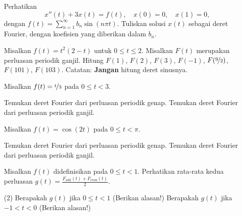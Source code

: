\begin{exercise}
Perhatikan
\begin{equation*}
x''(t) + 3 x(t) = f(t) , \quad x(0) = 0, \quad x(1) = 0,
\end{equation*}
dengan $f(t) = \sum_{n=1}^\infty b_n \sin (n \pi t)$.  Tuliskan solusi $x(t)$
sebagai deret Fourier, dengan koefisien yang diberikan dalam $b_n$.
\end{exercise}

\begin{exercise}
Misalkan $f(t) = t^2(2-t)$ untuk $0 \leq t \leq 2$.  Misalkan $F(t)$ merupakan perluasan periodik
ganjil.  Hitung $F(1)$, $F(2)$, $F(3)$, $F(-1)$, $F(\nicefrac{9}{2})$,
$F(101)$, $F(103)$.  Catatan: \textbf{Jangan} hitung deret sinusnya.
\end{exercise}

\setcounter{exercise}{100}

\begin{exercise}
Misalkan $f(t) = \nicefrac{t}{3}$ pada $0 \leq t < 3$.
\begin{tasks}
\task Temukan deret Fourier dari perluasan periodik genap.
\task Temukan deret Fourier dari perluasan periodik ganjil.
\end{tasks}
\end{exercise}

\begin{exercise}
Misalkan $f(t) = \cos(2t)$ pada $0 \leq t < \pi$.
\begin{tasks}
\task Temukan deret Fourier dari perluasan periodik genap.
\task Temukan deret Fourier dari perluasan periodik ganjil.
\end{tasks}
\end{exercise}

\begin{exercise}
Misalkan $f(t)$ didefinisikan pada $0 \leq t < 1$.  Perhatikan
rata-rata kedua perluasan
$g(t) = \frac{F_{\text{odd}}(t)+ F_{\text{even}}(t)}{2}$.
\begin{tasks}(2)
\task Berapakah $g(t)$ jika $0 \leq t < 1$ (Berikan alasan!)
\task Berapakah $g(t)$ jika $-1 < t < 0$ (Berikan alasan!)
\end{tasks}
\end{exercise}

